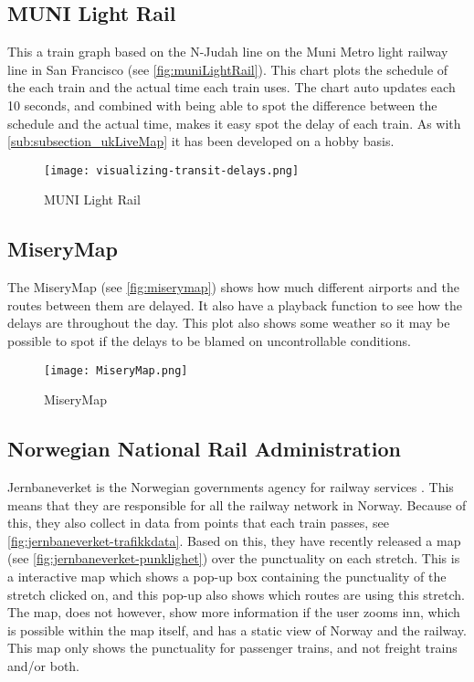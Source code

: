 \clearpage
\subsection{MUNI Light Rail}
\label{sub:subsection_muniLightRail}

This a train graph based on the N-Judah line on the Muni Metro light railway line in San Francisco (see \vref{fig:muniLightRail}). 
This chart plots the schedule of the each train and the actual time each train 
uses. The chart auto updates each 10 seconds, and combined with being able 
to spot the difference between the schedule and the actual time, makes it easy 
spot the delay of each train. As with \vref{sub:subsection_ukLiveMap} it has been 
developed on a hobby basis.

\begin{figure}[!htbp]
	\texttt{[image: visualizing-transit-delays.png]}
	\caption[MUNI Light Rail]{MUNI Light Rail \cite{muniLightRail}}
	\label{fig:muniLightRail}
\end{figure}
\pagebreak


\clearpage
\subsection{MiseryMap}
\label{sub:subsection_zugmonitor}

The MiseryMap (see \vref{fig:miserymap}) shows how much different airports and 
the routes between them are delayed. It also have a playback function to see
how the delays are throughout the day. This plot also shows some weather so it
may be possible to spot if the delays to be blamed on uncontrollable
conditions. 

\begin{figure}[!htbp]
	\texttt{[image: MiseryMap.png]}
	\caption[MiseryMap]{MiseryMap \cite{flightAware:MiseryMap}}
	\label{fig:miserymap}
\end{figure}
 
\clearpage
\subsection{Norwegian National Rail Administration}
\label{sub:subsection_jernbaneverket}

Jernbaneverket is the Norwegian governments agency for railway services \cite{jernbaneverketAbout}.
This means that they are responsible for all the railway network in Norway.
Because of this, they also collect in data from points that each train passes, see \vref{fig:jernbaneverket-trafikkdata}. 
Based on this, they have recently released a map (see \vref{fig:jernbaneverket-punklighet}) over the punctuality on each stretch. This is a 
interactive map which shows a pop-up box containing the punctuality of the 
stretch clicked on, and this pop-up also shows which routes are using this 
stretch. The map, does not however, show more information if the user zooms 
inn, which is possible within the map itself, and has a static view of Norway 
and the railway. This map only shows the punctuality for passenger trains, and
not freight trains and/or both.\\ 

